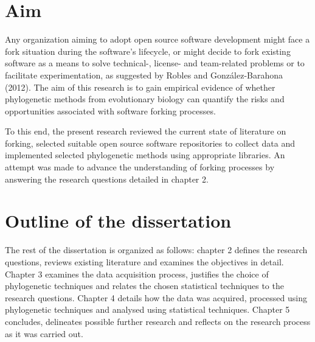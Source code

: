 
\section{Aim}
Any organization aiming to adopt open source software development might face a fork situation during the software's lifecycle, or might decide to fork existing software as a means to solve technical-, license- and team-related problems or to facilitate experimentation, as suggested by Robles and González-Barahona (2012). The aim of this research is to gain empirical evidence of whether phylogenetic methods from evolutionary biology can quantify the risks and opportunities associated with software forking processes.

To this end, the present research reviewed the current state of literature on forking, selected suitable open source software repositories to collect data and implemented selected phylogenetic methods using appropriate libraries. An attempt was made to advance the understanding of forking processes by answering the research questions detailed in chapter 2.


\section{Outline of the dissertation}
The rest of the dissertation is organized as follows: chapter 2 defines the research questions, reviews existing literature and examines the objectives in detail. Chapter 3 examines the data acquisition process, justifies the choice of phylogenetic techniques and relates the chosen statistical techniques to the research questions. Chapter 4 details how the data was acquired, processed using phylogenetic techniques and analysed using statistical techniques. Chapter 5 concludes, delineates possible further research and reflects on the research process as it was carried out.
